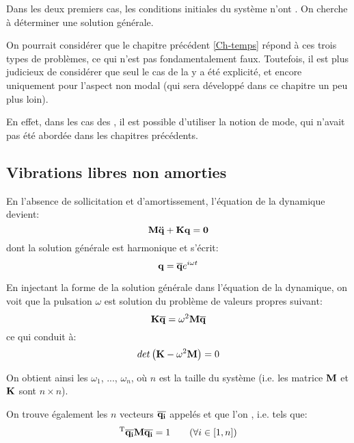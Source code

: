 Dans les deux premiers cas, les conditions initiales du système n'ont . 
On cherche à déterminer une solution générale. 


\medskip
On pourrait considérer que le chapitre précédent \ref{Ch-temps} répond à ces trois
types de problèmes, ce qui n'est pas fondamentalement faux.
Toutefois, il est plus judicieux de considérer que seul le cas de la   
y a été explicité, et encore uniquement pour l'aspect non modal (qui sera développé dans ce chapitre 
un peu plus loin).

En effet, dans les cas des  , 
il est possible d'utiliser la notion de mode, qui n'avait pas été abordée dans les chapitres précédents.





\medskip
\subsection{Vibrations libres non amorties}

En l'absence de sollicitation et d'amortissement, l'équation de la dynamique devient:
\begin{equation} \mathbf{M}\mathbf{\ddot{q}}+\mathbf{K}\mathbf{q}=\mathbf{0} \end{equation}
dont la solution générale est harmonique et s'écrit:
\begin{equation} \mathbf{q}=\mathbf{\overline{q}}e^{i\omega t} \end{equation}

En injectant la forme de la solution générale dans l'équation de la dynamique, on voit que la
pulsation $\omega$ est solution du problème de valeurs propres suivant:
\begin{equation} \mathbf{K}\mathbf{\overline{q}}=\omega^2\mathbf{M}\mathbf{\overline{q}} \end{equation}
ce qui conduit à:
\begin{equation} det\left(\mathbf{K}-\omega^2\mathbf{M}\right)=0\end{equation}

On obtient ainsi les  
$\omega_1$, ..., $\omega_n$, où $n$ est la taille du système (i.e. les matrice $\mathbf{M}$ et $\mathbf{K}$ sont $n\times n$).

On trouve également les $n$ vecteurs $\mathbf{\overline{q_i}}$ appelés  et que l'on , i.e. tels que:
\begin{equation} {}^\mathrm{T}\mathbf{\overline{q_i}}\mathbf{M}\mathbf{\overline{q_i}}=1 \qquad  (\forall i\in[1,n]) \end{equation}

